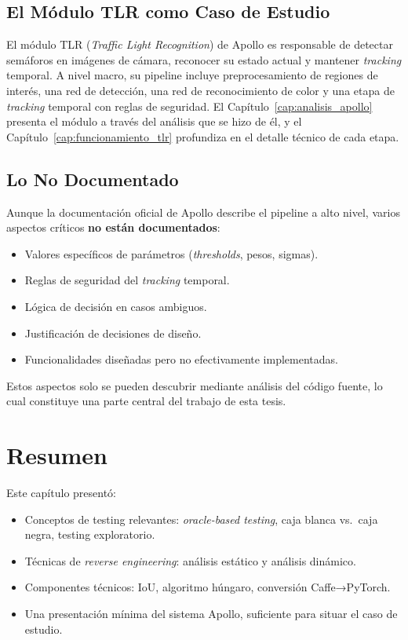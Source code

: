 \subsection{El Módulo TLR como Caso de Estudio}

El módulo TLR (\textit{Traffic Light Recognition}) de Apollo es responsable de detectar semáforos en imágenes de cámara, reconocer su estado actual y mantener \textit{tracking} temporal. A nivel macro, su pipeline incluye preprocesamiento de regiones de interés, una red de detección, una red de reconocimiento de color y una etapa de \textit{tracking} temporal con reglas de seguridad. El Capítulo~\ref{cap:analisis_apollo} presenta el módulo a través del análisis que se hizo de él, y el Capítulo~\ref{cap:funcionamiento_tlr} profundiza en el detalle técnico de cada etapa.

\subsection{Lo No Documentado}

Aunque la documentación oficial de Apollo describe el pipeline a alto nivel, varios aspectos críticos \textbf{no están documentados}:

\begin{itemize}
    \item Valores específicos de parámetros (\textit{thresholds}, pesos, sigmas).
    \item Reglas de seguridad del \textit{tracking} temporal.
    \item Lógica de decisión en casos ambiguos.
    \item Justificación de decisiones de diseño.
    \item Funcionalidades diseñadas pero no efectivamente implementadas.
\end{itemize}

Estos aspectos solo se pueden descubrir mediante análisis del código fuente, lo cual constituye una parte central del trabajo de esta tesis.

\section{Resumen}

Este capítulo presentó:

\begin{itemize}
    \item Conceptos de testing relevantes: \textit{oracle-based testing}, caja blanca vs.\ caja negra, testing exploratorio.
    \item Técnicas de \textit{reverse engineering}: análisis estático y análisis dinámico.
    \item Componentes técnicos: IoU, algoritmo húngaro, conversión Caffe→PyTorch.
    \item Una presentación mínima del sistema Apollo, suficiente para situar el caso de estudio.
\end{itemize}

